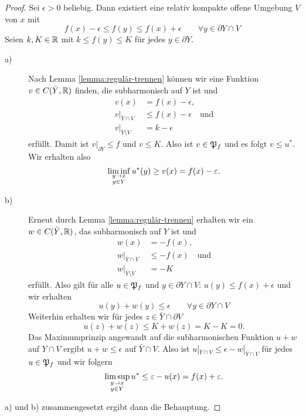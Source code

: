 \begin{proof}
  Sei $\epsilon > 0$ beliebig. Dann existiert eine relativ kompakte offene
  Umgebung $V$ von $x$ mit
  \[
  f(x) - \epsilon \leq f(y) \leq f(x) + \epsilon \qquad \forall y
  \in \partial Y \cap V
  \]
  Seien $k, K \in \mathbb{R}$ mit $k \leq f(y) \leq K$ für jedes $y
  \in \partial Y$.
  \begin{description}
  \item[a)] Nach Lemma \ref{lemma:regulär-trennen} können wir eine
    Funktion $v \in C(\bar Y, \mathbb{R})$ finden, die subharmonisch auf $Y$ ist und
    \begin{align*}
      v(x) & = f(x) - \epsilon, \\
      v|_{\bar Y \cap V} & \leq f(x) - \epsilon \quad \text{und} \\
      v|_{\bar Y \setminus V} & = k - \epsilon
    \end{align*}
    erfüllt. Damit ist $v|_{\partial Y} \leq f$ und $v \leq K$. Also ist $v \in
    \mathfrak{P}_f$ und es folgt $v \leq u^\ast$. Wir erhalten also
    \[
    \liminf_{\substack{y \rightarrow x\\y \in Y}} u^\ast(y) \geq v(x) = f(x) - \varepsilon.
    \]
  \item[b)] Erneut durch Lemma \ref{lemma:regulär-trennen} erhalten
    wir ein $w \in C(\bar Y, \mathbb{R})$, das subharmonisch auf $Y$ ist und
    \begin{align*}
      w(x) & = - f(x), \\
      w|_{\bar Y \cap V} & \leq -f(x) \quad \text{und} \\
      w|_{\bar Y \setminus V}  & = -K
    \end{align*}
    erfüllt. Also gilt für alle $u \in \mathfrak{P}_f$ und $y \in \partial Y \cap V$:
    $u(y) \leq f(x) + \epsilon$ und wir erhalten
    \[
    u(y) + w(y) \leq \epsilon \qquad \forall y \in \partial Y \cap V
    \]
    Weiterhin erhalten wir für jedes $z \in \bar Y \cap \partial V$
    \[
    u(z) + w(z) \leq K + w(z) = K - K  = 0.
    \]
    Das Maximumprinzip angewandt auf die subharmonischen Funktion $u+w$
    auf $Y \cap V$ ergibt $u + w \leq \epsilon $ auf $\bar Y \cap
    V$. Also ist $u|_{\bar Y \cap V} \leq \epsilon - w|_{\bar Y \cap V}$
    für jedes $u \in \mathfrak{P}_f$ und wir folgern
    \[
    \limsup_{\substack{y \rightarrow x\\y \in Y}}u^\ast \leq \varepsilon - u(x) = f(x)
    + \varepsilon.
    \]
  \end{description}
  a) und b) zusammengesetzt ergibt dann die Behauptung.
\end{proof}

